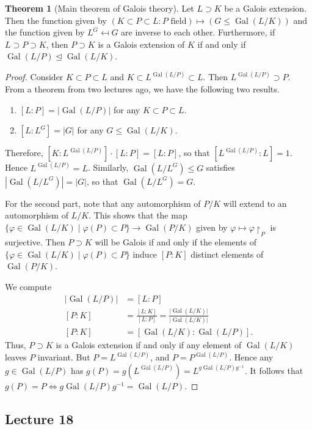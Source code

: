 \documentclass[10pt,letterpaper,cm]{nupset}
\theoremstyle{definition}
\theoremstyle{theorem}
\newtheorem{theorem}[definition]{Theorem}
\theoremstyle{remark}
\newcommand{\1}{\mathbf{1}}
\newcommand{\0}{\vec 0}
\DeclareMathOperator{\gal}{Gal}
\begin{document}
\begin{theorem}[Main theorem of Galois theory]
Let $L \supset K$ be a Galois extension. Then the function given by $(K \subset P \subset L : P \text{ field}) \mapsto (G \leq \gal(L/K))$ and the function given by $L^G \mapsfrom G$ are inverse to each other. Furthermore, if $L \supset P \supset K$, then $P \supset K$ is a Galois extension of $K$ if and only if $\gal(L/P) \unlhd \gal(L/K)$. 
\end{theorem}
\begin{proof}
Consider $K \subset P \subset L$ and $K \subset L^{\gal(L/P)} \subset L$. Then $L^{\gal(L/P)}\supset P$. From a theorem from two lectures ago, we have the following two results.
\begin{enumerate}[label=(\alph*)]
\item $[L:P] = |\gal(L/P)|$ for any $K \subset P \subset L$. 
\item $[L: L^G] = |G|$ for any $G \leq \gal(L/K)$. 
\end{enumerate}
Therefore, $[K: L^{\gal(L/P)}]\cdot [L:P] = [L:P]$, so that $[L^{\gal(L/P)} : L]= 1$. Hence $L^{\gal(L/P)} = L$. Similarly, $\gal(L/L^G) \leq G$ satisfies $|\gal(L/L^G)| = |G|$, so that $\gal(L/L^G) = G$. 

\medskip


For the second part, note that any automorphism of $P/K$ will extend to an automorphism of $L/K$. This shows that the map $\{\varphi \in \gal(L/K) \mid \varphi(P) \subset P\} \to \gal(P/K)$ given by $\varphi \mapsto \varphi \restriction_P$ is surjective. Then $P \supset K$ will be Galois if and only if the elements of $\{\varphi \in \gal(L/K) \mid \varphi(P) \subset P\}$ induce $[P:K]$ distinct elements of $\gal(P/K)$. 

\medskip


We compute
\begin{align*}
|\gal(L/P)| & = [L:P]
\\ [P:K] & = \frac{[L:K]}{[L:P]} = \frac{\lvert{\gal(L/K)}\rvert}{\lvert{\gal(L/K)}\rvert}
\\ [P:K] & = [\gal(L/K) : \gal(L/P)].
\end{align*}
Thus, $P \supset K$ is a Galois extension if and only if any element of $\gal(L/K)$ leaves $P$ invariant. But $P = L^{\gal(L/P)}$, and $P = P^{\gal(L/P)}$. Hence any $g \in \gal(L/P)$ has $g(P) = g(L^{\gal(L/P)}) = L^{g\gal(L/P)g^{-1}}$. It follows that $g(P) = P \iff g\gal(L/P)g^{-1} = \gal(L/P)$.
\end{proof}

\subsection{Lecture 18}
\end{document}
